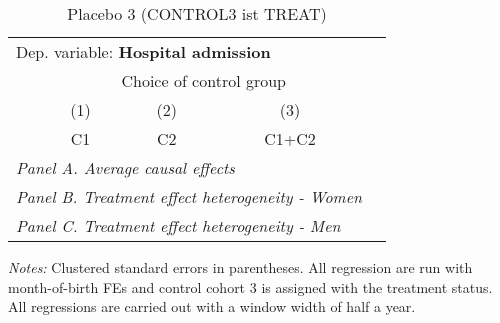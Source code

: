  \begin{table}[H] \centering \begin{threeparttable} \caption{Placebo 3 (CONTROL3 ist TREAT) } {\def\sym#1{\ifmmode^{#1}\else\(^{#1}\)\fi} \begin{tabular}{l*{4}{c}} \toprule \multicolumn{4}{l}{Dep. variable: \textbf{Hospital admission}} \\ & \multicolumn{3}{c}{Choice of control group} \\ \cmidrule(lr){2-4}
            &\multicolumn{1}{c}{(1)}&\multicolumn{1}{c}{(2)}&\multicolumn{1}{c}{(3)}\\
            &\multicolumn{1}{c}{C1}&\multicolumn{1}{c}{C2}&\multicolumn{1}{c}{C1+C2}\\
\midrule
 \multicolumn{4}{l}{\emph{Panel A. Average causal effects}} \\      \midrule\multicolumn{4}{l}{\emph{Panel B. Treatment effect heterogeneity - Women}} \\      \midrule\multicolumn{4}{l}{\emph{Panel C. Treatment effect heterogeneity - Men}} \\      
\bottomrule \end{tabular} } \begin{tablenotes} \item \scriptsize \emph{Notes:} Clustered standard errors in parentheses. All regression are run with month-of-birth FEs and control cohort 3 is assigned with the treatment status. All regressions are carried out with a window width of half a year. \end{tablenotes} \end{threeparttable} \end{table} 
